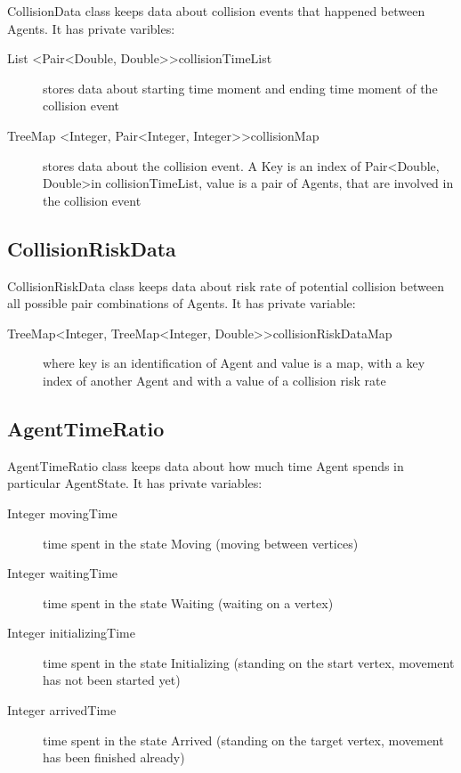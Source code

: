 \documentclass[thesis=B,english]{FITthesis}[2019/12/23]
\begin{document}
CollisionData class keeps data about collision events that happened between Agents.
It has private varibles:  
\begin{description}
\item[List \textless Pair\textless Double, Double\textgreater\textgreater collisionTimeList] stores data about starting time moment and ending time moment of the collision event
\item[TreeMap \textless Integer, Pair\textless Integer, Integer\textgreater\textgreater collisionMap] stores data about the collision event. A Key is an index of Pair\textless Double, Double\textgreater in collisionTimeList, value is a pair of Agents, that are involved in the collision event
\end{description}

\subsection{CollisionRiskData}

CollisionRiskData class keeps data about risk rate of potential collision between all possible pair combinations of Agents. It has private variable:
\begin{description}
\item[TreeMap\textless Integer, TreeMap\textless Integer, Double\textgreater\textgreater collisionRiskDataMap] where key is an identification of Agent and value is a map, with a key index of another Agent and with a value of a collision risk rate
\end{description}

\subsection{AgentTimeRatio}

AgentTimeRatio class keeps data about how much time Agent spends in particular AgentState. It has private variables:
\begin{description}
\item[Integer movingTime] time spent in the state Moving (moving between vertices)
\item[Integer waitingTime] time spent in the state Waiting (waiting on a vertex)
\item[Integer initializingTime] time spent in the state Initializing (standing on the start vertex, movement has not been started yet)
\item[Integer arrivedTime] time spent in the state Arrived (standing on the target vertex, movement has been finished already)
\end{description}
\end{document}
